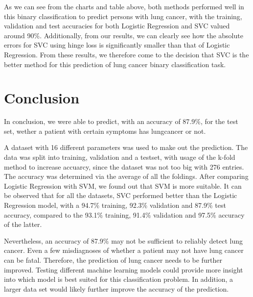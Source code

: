 \documentclass[a4paper,12pt]{article}
\begin{document}
\begin{center}
\begin{tabular}{l}
\\
\end{tabular}
\end{center}



As we can see from the charts and table above, both methods performed well in this binary classification to predict persons with lung cancer, with the training, validation and test accuracies for both Logistic Regression and SVC valued around 90\%.
Additionally, from our results, we can clearly see how the absolute errors for SVC using hinge loss is significantly smaller than that of Logistic Regression.
From these results, we therefore come to the decision that SVC is the better method for this prediction of lung cancer binary classification task.

\section{Conclusion}
\label{sec:org3a9bd02}

In conclusion, we were able to predict, with an accuracy of 87.9\%, for the test set, wether a patient with certain symptoms has lungcancer or not.

A dataset with 16 different parameters was used to make out the prediction.
The data was split into training, validation and a testset, with usage of the k-fold method to increase accuarcy, since the dataset was not too big with 276 entries.
The accuracy was determined via the average of all the foldings.
After comparing Logistic Regression with SVM, we found out that SVM is more suitable.
It can be observed that for all the datasets, SVC performed better than the Logistic Regression model, with a 94.7\% training, 92.3\% validation and 87.9\% test accuracy, compared to the 93.1\% training, 91.4\% validation and 97.5\% accuracy of the latter.

Nevertheless, an accuracy of 87.9\% may not be sufficient to reliably detect lung cancer.
Even a few misdiagnoses of whether a patient may not have lung cancer can be fatal. Therefore, the prediction of lung cancer needs to be further improved.
Testing different machine learning models could provide more insight into which model is best suited for this classification problem.
In addition, a larger data set would likely further improve the accuracy of the prediction.
\end{document}
